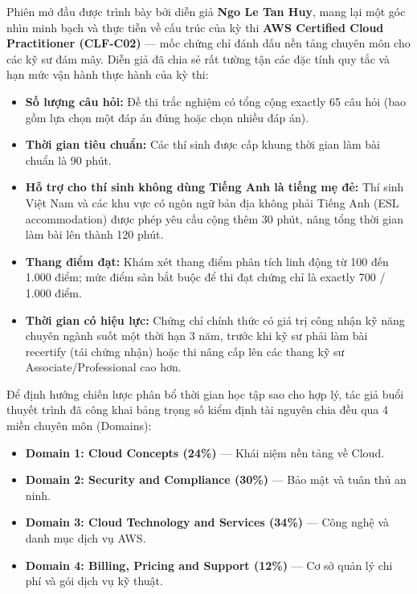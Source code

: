 Phiên mở đầu được trình bày bởi diễn giả \textbf{Ngo Le Tan Huy}, mang
lại một góc nhìn minh bạch và thực tiễn về cấu trúc của kỳ thi
\textbf{AWS Certified Cloud Practitioner (CLF-C02)} --- mốc chứng chỉ
đánh dấu nền tảng chuyên môn cho các kỹ sư đám mây. Diễn giả đã chia sẻ
rất tường tận các đặc tính quy tắc và hạn mức vận hành thực hành của kỳ
thi:

\begin{itemize}
\tightlist
\item
  \textbf{Số lượng câu hỏi:} Đề thi trắc nghiệm có tổng cộng exactly 65
  câu hỏi (bao gồm lựa chọn một đáp án đúng hoặc chọn nhiều đáp án).
\item
  \textbf{Thời gian tiêu chuẩn:} Các thí sinh được cấp khung thời gian
  làm bài chuẩn là 90 phút.
\item
  \textbf{Hỗ trợ cho thí sinh không dùng Tiếng Anh là tiếng mẹ đẻ:} Thí
  sinh Việt Nam và các khu vực có ngôn ngữ bản địa không phải Tiếng Anh
  (ESL accommodation) được phép yêu cầu cộng thêm 30 phút, nâng tổng
  thời gian làm bài lên thành 120 phút.
\item
  \textbf{Thang điểm đạt:} Khám xét thang điểm phân tích linh động từ
  100 đến 1.000 điểm; mức điểm sàn bắt buộc để thi đạt chứng chỉ là
  exactly 700 / 1.000 điểm.
\item
  \textbf{Thời gian có hiệu lực:} Chứng chỉ chính thức có giá trị công
  nhận kỹ năng chuyên ngành suốt một thời hạn 3 năm, trước khi kỹ sư
  phải làm bài recertify (tái chứng nhận) hoặc thi nâng cấp lên các
  thang kỹ sư Associate/Professional cao hơn.
\end{itemize}

Để định hướng chiến lược phân bổ thời gian học tập sao cho hợp lý, tác
giả buổi thuyết trình đã công khai bảng trọng số kiểm định tài nguyên
chia đều qua 4 miền chuyên môn (Domains):

\begin{itemize}
\tightlist
\item
  \textbf{Domain 1: Cloud Concepts (24\%)} --- Khái niệm nền tảng về
  Cloud.
\item
  \textbf{Domain 2: Security and Compliance (30\%)} --- Bảo mật và tuân
  thủ an ninh.
\item
  \textbf{Domain 3: Cloud Technology and Services (34\%)} --- Công nghệ
  và danh mục dịch vụ AWS.
\item
  \textbf{Domain 4: Billing, Pricing and Support (12\%)} --- Cơ sở quản
  lý chi phí và gói dịch vụ kỹ thuật.
\end{itemize}

